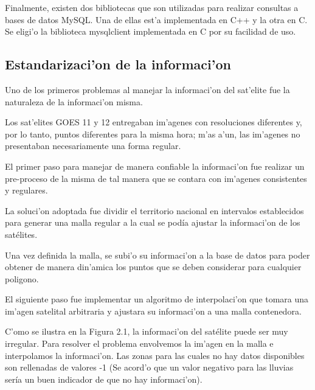   Finalmente, existen dos bibliotecas que son utilizadas para realizar consultas
  a bases de datos MySQL. Una de ellas est'a implementada en C++ y la otra en C.
  Se eligi'o la biblioteca mysqlclient implementada en C por su facilidad de uso.

\subsection{Estandarizaci'on de la informaci'on}
  Uno de los primeros problemas al manejar la informaci'on del sat'elite fue la naturaleza de la informaci'on 
  misma. 

  Los sat'elites GOES 11 y 12 entregaban im'agenes con resoluciones diferentes y, por lo tanto, puntos 
  diferentes para la misma hora; m'as a'un, las im'agenes no presentaban necesariamente una forma regular.

  El primer paso para manejar de manera confiable la informaci'on fue realizar un pre-proceso de la misma
  de tal manera que se contara con im'agenes consistentes y regulares.

  La soluci'on adoptada fue dividir el territorio nacional en intervalos establecidos para generar una malla regular
  a la cual se podía ajustar la informaci'on de los satélites.

  Una vez definida la malla, se subi'o su informaci'on a la base de datos para poder obtener 
  de manera din'amica los puntos que se deben considerar para cualquier poligono. 

  El siguiente paso fue implementar un algoritmo de interpolaci'on que tomara una im'agen satelital arbitraria y 
  ajustara su informaci'on a una malla contenedora.

  C'omo se ilustra en la Figura 2.1, la informaci'on del satélite puede ser muy irregular. Para resolver el problema 
  envolvemos la im'agen en la malla e interpolamos la informaci'on. Las zonas para las cuales no hay datos disponibles
  son rellenadas de valores -1 (Se acord'o que un valor negativo para las lluvias sería un buen indicador de que no hay
  informaci'on).

